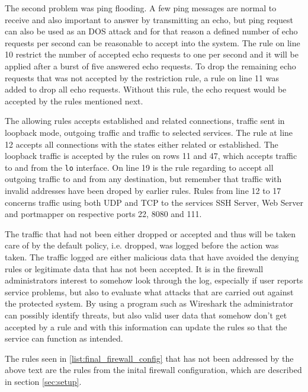 The second problem was ping flooding. A few ping messages are normal to receive and also important to answer by transmitting an echo, but ping request can also be used as an DOS attack and for that reason a defined number of echo requests per second can be reasonable to accept into the system. The rule on line 10 restrict the number of accepted echo requests to one per second and it will be applied after a burst of five answered echo requests. To drop the remaining echo requests that was not accepted by the restriction rule, a rule on line 11 was added to drop all echo requests. Without this rule, the echo request would be accepted by the rules mentioned next.

The allowing rules accepts established and related connections, traffic sent in loopback mode, outgoing traffic and traffic to selected services. The rule at line 12  accepts all connections with the states either related or established. The loopback traffic is accepted by the rules on rows 11 and 47, which accepts traffic to and from the \texttt{lo} interface. On line 19 is the rule regarding to accept all outgoing traffic to and from any destination, but remember that traffic with invalid addresses have been droped by earlier rules. Rules from line 12 to 17 concerns traffic using both UDP and TCP to the services SSH Server, Web Server and portmapper on respective ports 22, 8080 and 111.

The traffic that had not been either dropped or accepted and thus will be taken care of by the default policy, i.e. dropped, was logged before the action was taken. The traffic logged are either malicious data that have avoided the denying rules or legitimate data that has not been accepted. It is in the firewall administrators interest to somehow look through the log, especially if user reports service problems, but also to evaluate what attacks that are carried out against the protected system. By using a program such as Wireshark the administrator can possibly identify threats, but also valid user data that somehow don't get accepted by a rule and with this information can update the rules so that the service can function as intended. 

The rules seen in \ref{list:final_firewall_config} that has not been addressed by the above text are the rules from the inital firewall configuration, which are described in section \ref{sec:setup}.

\label{list:final_firewall_config}